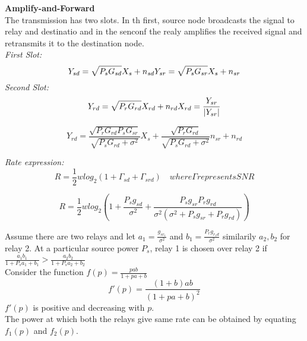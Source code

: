 \documentclass[titlepage]{article}
\begin{document}
\textbf{Amplify-and-Forward} \\
The transmission has two slots. In th first, source node broadcasts the signal to
relay and destinatio and in the senconf the realy amplifies the received signal 
and retransmits it to the destination node. \\
\textit{First Slot:}
\begin{equation}
	Y_{sd} = \sqrt{P_s G_{sd}} X_s + n_{sd} \\
	Y_{sr} = \sqrt{P_s G_{sr}} X_s + n_{sr} \\
\end{equation}
\textit{Second Slot:}
\begin{equation}
	Y_{rd} = \sqrt{P_r G_{rd}} X_{rd} + n_{rd} \\
	X_{rd} = \frac{Y_{sr}}{|Y_{sr}|} \\
\end{equation}

\begin{equation}
	Y_{rd} = \frac{\sqrt{P_r G_{rd} P_s G_{sr}}}{\sqrt{P_s G_{rd} + \sigma^2}}X_s + \frac{\sqrt{P_rG_{rd}}}{\sqrt{P_s G_{rd} + \sigma^2}} n_{sr} + n_{rd} 
\end{equation}

\textit{Rate expression:}
\begin{equation}
	R = \frac{1}{2} w log_2(1+\Gamma_{sd}+\Gamma_{srd}) \quad where \Gamma 
	represents SNR
\end{equation}

\begin{equation}
R = \frac{1}{2} w log_2(1+\frac{P_s g_{sd}}{\sigma^2} +
\frac{P_s g_{sr} P_r g_{rd}}{\sigma^2(\sigma^2 + P_sg_{sr} + P_rg_{rd})})
\end{equation}

Assume there are two relays and let $a_1 = \frac{g_{sr_1}}{\sigma^2}$
and $b_1 = \frac{P_{r} g_{r_1 d}}{\sigma^2}$ similarily $a_2, b_2$ for relay 2.
At a particular source power $P_s$, relay 1 is chosen over relay 2
if $\frac{a_1b_1}{1+P_s a_1 + b_1} > \frac{a_2b_2}{1+P_s a_2 + b_2}
 $
\\
Consider the function $f(p) = \frac{pab}{1+p a + b} $ \\
\begin{equation}
f'(p) = \frac{(1+b)ab}{(1+pa+b)^2}
\end{equation}
$f'(p)$ is positive and decreasing with $p$. \\
The power at which both the relays give same rate can be obtained 
by equating $f_1(p)$ and $f_2(p)$.
\end{document}

